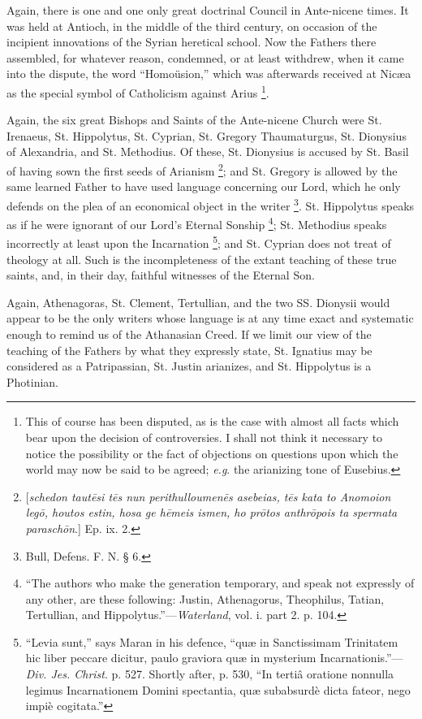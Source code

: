 Again, there is one and one only great doctrinal
Council in Ante-nicene times. It was held at Antioch, in
the middle of the third century, on occasion of the
incipient innovations of the Syrian heretical school. Now
the Fathers there assembled, for whatever reason,
condemned, or at least withdrew, when it came into the
dispute, the word ``Homoüsion,''
which was afterwards received at Nicæa as the special
symbol of Catholicism against Arius \footnote{This of course has been
disputed, as is the case with almost all facts which bear
upon the decision of controversies. I shall not think it
necessary to notice the possibility or the fact of
objections on questions upon which the world may now be
said to be agreed; \emph{e.g}. the arianizing tone of
Eusebius.}.

Again, the six great Bishops and Saints of the
Ante-nicene Church were St. Irenaeus, St. Hippolytus, St.
Cyprian, St. Gregory Thaumaturgus, St. Dionysius of
Alexandria, and St. Methodius. Of these, St. Dionysius is
accused by St. Basil of having sown the first seeds of
Arianism \footnote{[\emph{schedon taut\={e}si t\={e}s
nun perithulloumen\={e}s asebeias, t\={e}s kata to Anomoion leg\={o},
houtos estin, hosa ge h\={e}meis ismen, ho pr\={o}tos anthr\={o}pois
ta spermata parasch\={o}n}.] Ep. ix. 2.};
and St. Gregory is allowed by the same learned Father to
have used language concerning our Lord, which he only
defends on the plea of an economical object in the writer
\footnote{Bull, Defens. F. N. § 6.}. St.
Hippolytus speaks as if he were ignorant of our Lord's
Eternal Sonship \footnote{``The authors who make the
generation temporary, and speak not expressly of any
other, are these following: Justin, Athenagorus,
Theophilus, Tatian, Tertullian, and
Hippolytus.''—\emph{Waterland}, vol. i. part 2.
p. 104.}; St. Methodius speaks incorrectly at least upon
the Incarnation \footnote{``Levia sunt,'' says
Maran in his defence, ``quæ in Sanctissimam
Trinitatem hic liber peccare dicitur, paulo graviora quæ
in mysterium Incarnationis.''—\emph{Div. Jes. Christ}. p.
527. Shortly after, p. 530, ``In tertiâ oratione
nonnulla legimus Incarnationem Domini spectantia, quæ
subabsurdè dicta fateor, nego impiè cogitata.''}; and St. Cyprian does not treat of theology at
all. Such is the incompleteness of the extant teaching of
these true saints, and, in their day, faithful witnesses
of the Eternal Son.

Again, Athenagoras, St. Clement, Tertullian, and the
two SS. Dionysii would appear to be the only writers
whose language is at any time exact and systematic enough
to remind us of the Athanasian Creed. If we limit our
view of the teaching of the Fathers by what they
expressly state, St. Ignatius may be considered as a
Patripassian, St. Justin arianizes, and St. Hippolytus is
a Photinian.

